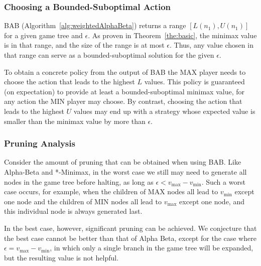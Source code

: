 \documentclass[letterpaper]{article} %
\newcommand{\pess}{\mathit{L}}
\newcommand{\opti}{\mathit{U}}
\newcommand{\vmax}{v_{\text{max}}}
\newcommand{\vmin}{v_{\text{min}}}
\newcommand{\rootnode}{\mathit{n_1}}
\begin{document}
\subsubsection{Choosing a Bounded-Suboptimal Action}
BAB (Algorithm~\ref{alg:weightedAlphaBeta}) returns a range $[\pess(\rootnode), \opti(\rootnode)]$ for a given game tree and $\epsilon$. As proven in Theorem~\ref{the:basic}, the minimax value is in that range, and the size of the range is at most $\epsilon$. Thus, any value chosen in that range can serve as a bounded-suboptimal solution for the given $\epsilon$. 

To obtain a concrete policy from the output of BAB the MAX player needs to choose the action that leads to the highest $\pess$ values. This policy is guaranteed (on expectation) to provide at least a bounded-suboptimal minimax value, for any action the MIN player may choose. By contrast, choosing the action that leads to the highest $\opti$ values may end up with a strategy whose expected value is smaller than the minimax value by more than $\epsilon$. %




\subsubsection{Pruning Analysis}


Consider the amount of pruning that can be obtained when using BAB. Like Alpha-Beta and *-Minimax, in the worst case we still may need to generate all nodes in the game tree before halting, as long as $\epsilon<\vmax-\vmin$. 
Such a worst case occurs, for example, when the children of MAX nodes all lead to $\vmin$ except one node
and the children of MIN nodes all lead to $\vmax$ except one node, and this individual node is always generated last. 

In the best case, however, significant pruning can be achieved.
We conjecture that the best case cannot be better than that of Alpha Beta, except for the case where $\epsilon=\vmax-\vmin$, in which only a single branch in the game tree will be expanded, but the resulting value is not helpful. 
\end{document}
